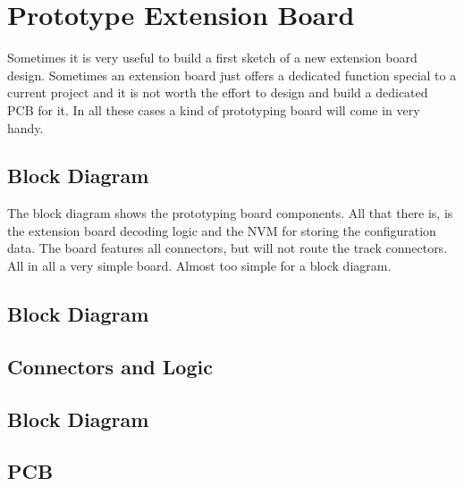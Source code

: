 \chapter{Prototype Extension Board}

Sometimes it is very useful to build a first sketch of a new extension board design. Sometimes an extension board just offers a dedicated function special to a current project and it is not worth the effort to design and build a dedicated PCB for it. In all these cases a kind of prototyping board will come in very handy.

\section{Block Diagram}

The block diagram shows the prototyping board components. All that there is, is the extension board decoding logic and the NVM for storing the configuration data. The board features all connectors, but will not route the track connectors. All in all a very simple board. Almost too simple for a block diagram.

\section{Block Diagram}


\section{Connectors and Logic}

\section{Block Diagram}


\section{PCB}

